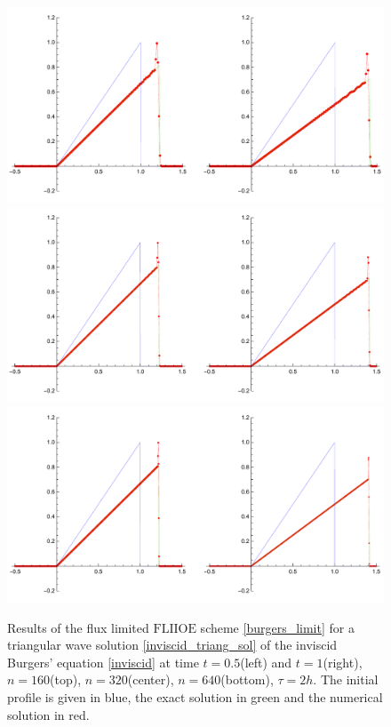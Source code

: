 \documentclass[../include.tex]{subfiles}
\begin{document}
\begin{figure}[H]
	\centering
	\includegraphics[width=.9\textwidth]{figures/inviscidTriang_160_2h}
	\includegraphics[width=.9\textwidth]{figures/inviscidTriang_320_2h}
	\includegraphics[width=.9\textwidth]{figures/inviscidTriang_640_2h}
	\caption{Results of the flux limited $\mathrm{FLIIOE}$ scheme \eqref{burgers_limit} for a triangular wave solution \eqref{inviscid_triang_sol} of the inviscid Burgers' equation \eqref{inviscid} at time $ t=0.5 $(left) and $ t=1 $(right), $ n=160 $(top), $n=320 $(center), $n=640 $(bottom), $ \tau=2h $. The initial profile is given in blue, the exact solution in green and the numerical solution in red.}
	\label{fig:fliioe_burg_triang_2h}
\end{figure}
\end{document}
